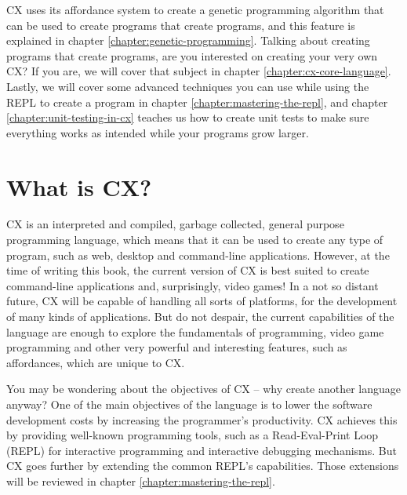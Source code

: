 \documentclass[11pt,fleqn,openany]{book} %
\begin{document}
CX uses its affordance system to create a genetic programming algorithm that can be used to create programs that create programs, and this feature is explained in chapter \ref{chapter:genetic-programming}. Talking about creating programs that create programs, are you interested on creating your very own CX? If you are, we will cover that subject in chapter \ref{chapter:cx-core-language}. Lastly, we will cover some advanced techniques you can use while using the REPL to create a program in chapter \ref{chapter:mastering-the-repl}, and chapter \ref{chapter:unit-testing-in-cx} teaches us how to create unit tests to make sure everything works as intended while your programs grow larger.

\section{What is CX?}


CX is an interpreted and compiled, garbage collected, general purpose programming language, which means that it can be used to create any type of program, such as web, desktop and command-line applications. However, at the time of writing this book, the current version of CX is best suited to create command-line applications and, surprisingly, video games! In a not so distant future, CX will be capable of handling all sorts of platforms, for the development of many kinds of applications. But do not despair, the current capabilities of the language are enough to explore the fundamentals of programming, video game programming and other very powerful and interesting features, such as affordances, which are unique to CX.

You may be wondering about the objectives of CX -- why create another language anyway? One of the main objectives of the language is to lower the software development costs by increasing the programmer's productivity. CX achieves this by providing well-known programming tools, such as a Read-Eval-Print Loop (REPL) for interactive programming and interactive debugging mechanisms. But CX goes further by extending the common REPL's capabilities. Those extensions will be reviewed in chapter \ref{chapter:mastering-the-repl}.
\end{document}
